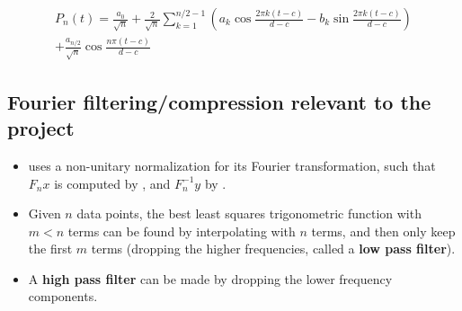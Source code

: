 \begin{gather*}
    P_n(t) = \frac{a_0}{\sqrt{n}}  
    + \frac{2}{\sqrt{n}} \sum_{k=1}^{n/2-1} \left( a_k \cos{\frac{2 \pi k (t-c)}{d-c}} - b_k \sin{\frac{2 \pi k (t-c)}{d-c}} \right) \\
    + \frac{a_{n/2}}{\sqrt{n}} \cos{\frac{n \pi (t-c)}{d-c}}
\end{gather*}

\subsection{Fourier filtering/compression relevant to the project}
\begin{itemize}
    \item {} uses a non-unitary normalization for its Fourier transformation, such that $F_n x$ is computed by , and $F_n^{-1} y$ by .
    \item Given $n$ data points, the best least squares trigonometric function with $m < n$ terms can be found by interpolating with $n$ terms, and then only keep the first $m$ terms (dropping the higher frequencies, called a \textbf{low pass filter}).
    \item A \textbf{high pass filter} can be made by dropping the lower frequency components.
\end{itemize}